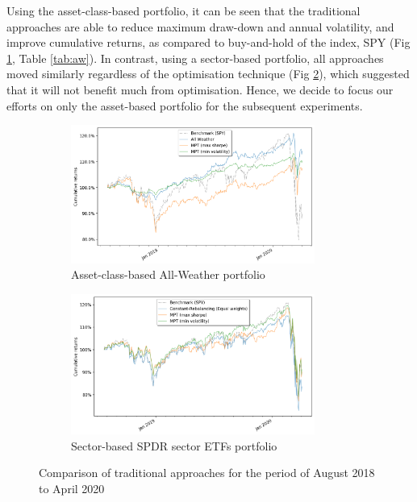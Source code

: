 \documentclass{article}
\begin{document}
Using the asset-class-based portfolio, it can be seen that the traditional approaches are able to reduce maximum draw-down and annual volatility, and improve cumulative returns, as compared to buy-and-hold of the index, SPY (Fig \ref{figure_bm_aw}, Table \ref{tab:aw}). In contrast, using a sector-based portfolio, all approaches moved similarly regardless of the optimisation technique (Fig \ref{figure_bm_sector}), which suggested that it will not benefit much from optimisation. Hence, we decide to focus our efforts on only the asset-based portfolio for the subsequent experiments.

\begin{figure}[tbh]
    \begin{subfigure}[t]{8cm}
        \includegraphics[width=8cm]{figure_benchmark_all_weather.png}
        \caption{Asset-class-based All-Weather portfolio \label{figure_bm_aw}}
    \end{subfigure}
    \begin{subfigure}[t]{8cm}
        \includegraphics[width=8cm]{figure_benchmark_sectors.png}
        \caption{Sector-based SPDR sector ETFs portfolio\label{figure_bm_sector}}
    \end{subfigure}
\caption{Comparison of traditional approaches for the period of August 2018 to April 2020 \label{figure_bm}}
\end{figure}
\end{document}
